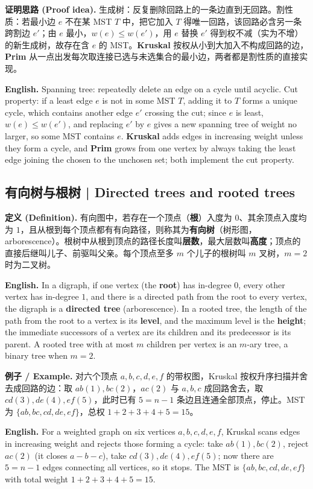 \documentclass[UTF8,11pt,a4paper]{ctexart}
\newcommand{\EN}[1]{\par\noindent \textbf{English.} #1\par}
\newcommand{\EX}[2]{\par\noindent \textbf{例子 / Example.} #1\par\EN{#2}}
\newcommand{\DEF}[2]{\par\noindent\textbf{定义 (Definition).} #1\par\EN{#2}}
\newcommand{\PRF}[2]{\par\noindent\textbf{证明思路 (Proof idea).} #1\par\EN{#2}}
\begin{document}
\PRF{生成树：反复删除回路上的一条边直到无回路。割性质：若最小边 $e$ 不在某 MST $T$ 中，把它加入 $T$ 得唯一回路，该回路必含另一条跨割边 $e'$；由 $e$ 最小，$w(e)\le w(e')$，用 $e$ 替换 $e'$ 得到权不减（实为不增）的新生成树，故存在含 $e$ 的 MST。\textbf{Kruskal} 按权从小到大加入不构成回路的边，\textbf{Prim} 从一点出发每次取连接已选与未选集合的最小边，两者都是割性质的直接实现。}{Spanning tree: repeatedly delete an edge on a cycle until acyclic. Cut property: if a least edge $e$ is not in some MST $T$, adding it to $T$ forms a unique cycle, which contains another edge $e'$ crossing the cut; since $e$ is least, $w(e)\le w(e')$, and replacing $e'$ by $e$ gives a new spanning tree of weight no larger, so some MST contains $e$. \textbf{Kruskal} adds edges in increasing weight unless they form a cycle, and \textbf{Prim} grows from one vertex by always taking the least edge joining the chosen to the unchosen set; both implement the cut property.}

\subsection{有向树与根树 | Directed trees and rooted trees}
\DEF{有向图中，若存在一个顶点（\textbf{根}）入度为 $0$、其余顶点入度均为 $1$，且从根到每个顶点都有有向路径，则称其为\textbf{有向树}（树形图，arborescence）。根树中从根到顶点的路径长度叫\textbf{层数}，最大层数叫\textbf{高度}；顶点的直接后继叫儿子、前驱叫父亲。每个顶点至多 $m$ 个儿子的根树叫 $m$ 叉树，$m=2$ 时为二叉树。}{In a digraph, if one vertex (the \textbf{root}) has in-degree $0$, every other vertex has in-degree $1$, and there is a directed path from the root to every vertex, the digraph is a \textbf{directed tree} (arborescence). In a rooted tree, the length of the path from the root to a vertex is its \textbf{level}, and the maximum level is the \textbf{height}; the immediate successors of a vertex are its children and its predecessor is its parent. A rooted tree with at most $m$ children per vertex is an $m$-ary tree, a binary tree when $m=2$.}

\EX{对六个顶点 $a,b,c,d,e,f$ 的带权图，Kruskal 按权升序扫描并舍去成回路的边：取 $ab(1),bc(2)$，$ac(2)$ 与 $a,b,c$ 成回路舍去，取 $cd(3),de(4),ef(5)$，此时已有 $5=n-1$ 条边且连通全部顶点，停止。MST 为 $\{ab,bc,cd,de,ef\}$，总权 $1+2+3+4+5=15$。}{For a weighted graph on six vertices $a,b,c,d,e,f$, Kruskal scans edges in increasing weight and rejects those forming a cycle: take $ab(1),bc(2)$, reject $ac(2)$ (it closes $a{-}b{-}c$), take $cd(3),de(4),ef(5)$; now there are $5=n-1$ edges connecting all vertices, so it stops. The MST is $\{ab,bc,cd,de,ef\}$ with total weight $1+2+3+4+5=15$.}
\end{document}
